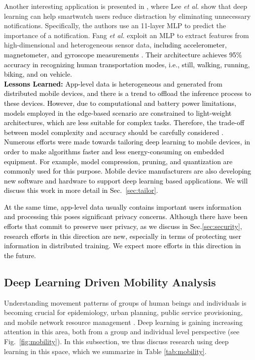 \documentclass[journal,comsoc,letter]{IEEEtran}
\newcommand{\edit}[1]{\textcolor{black}{#1}}
\newcommand{\rev}[1]{\textcolor{black}{#1}}
\begin{document}
Another interesting application is presented in \cite{lee2016reducing}, where Lee \emph{et al.} show that deep learning can help smartwatch users reduce distraction by eliminating unnecessary notifications. Specifically, the authors use an 11-layer MLP to predict the importance of a notification.  Fang \emph{et al.} exploit an MLP to extract features from high-dimensional and heterogeneous sensor data, \edit{including accelerometer,  magnetometer,  and  gyroscope  measurements \cite{fang2017learning}. Their architecture achieves 95\%  accuracy in recognizing human transportation modes, i.e., still, walking, running, biking, and on vehicle.}\\

\noindent \edit{\textbf{Lessons Learned:} App-level data is heterogeneous and generated from distributed mobile devices, and there is a trend to offload the inference process to these devices. However, due to computational and battery power limitations, models employed in the edge-based scenario are constrained to light-weight architectures, which are less suitable for complex tasks. Therefore, the trade-off between model complexity and accuracy should be carefully considered \cite{mohammadi2018deep}. \rev{Numerous efforts were made towards tailoring deep learning to mobile devices, in order to make algorithms faster and less energy-consuming on embedded equipment. For example, model compression, pruning, and quantization are commonly used for this purpose. Mobile device manufacturers are also developing new software and hardware to support deep learning based applications. We will discuss this work in more detail in Sec.~\ref{sec:tailor}. }}

\edit{
At the same time, app-level data usually contains important users information and processing this poses significant privacy concerns. Although there have been efforts that commit to preserve user privacy, as we discuss in Sec.\ref{sec:security}, research efforts in this direction are new, especially in terms of protecting user information in distributed training. We expect more efforts in this direction in the future.}

\subsection{Deep Learning Driven Mobility Analysis}
Understanding movement patterns of groups of human beings and individuals is becoming crucial for epidemiology, urban planning, public service provisioning, and mobile network resource management \cite{zhao2016urban}. Deep learning is gaining increasing attention in this area, both from a group and individual level perspective (see  Fig.~\ref{fig:mobility}). In this subsection, we thus discuss research using deep learning in this space, which we summarize in Table \ref{tab:mobility}.
\end{document}
